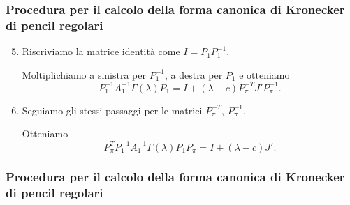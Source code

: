 \begin{frame}
	\frametitle{Procedura per il calcolo della forma canonica di Kronecker di pencil regolari}
	\begin{enumerate}
		\setcounter{enumi}{4}
		\item Riscriviamo la matrice identit\`a come \(I = P_1P_1^{-1}\).

		Moltiplichiamo
		a sinistra per $P_1^{-1}$, a destra per $P_1$ e otteniamo
		\[
			P_{1}^{-1} A_{1}^{-1} \Gamma(\lambda) P_{1} =
			I + (\lambda - c)P_{\pi}^{-T} J' P_{\pi}^{-1}.
		\]
		\item {} Seguiamo gli stessi passaggi per le matrici $P_\pi^{-T}$, $P_\pi^{-1}$.

		Otteniamo
		\[
			P_{\pi}^T P_{1}^{-1} A_{1}^{-1} \Gamma(\lambda) P_{1} P_{\pi} = I + (\lambda - c)J'.
		\]
	\end{enumerate}
\end{frame}

\begin{frame}[fragile]
	\frametitle{Procedura per il calcolo della forma canonica di Kronecker di pencil regolari}
\end{frame}
